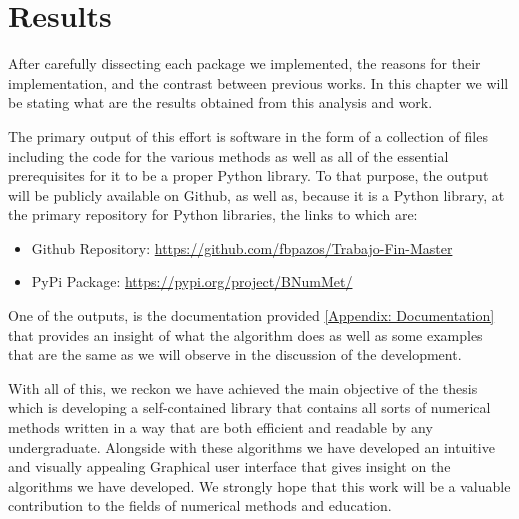 \chapter{Results}
After carefully dissecting each package we implemented, the reasons for their implementation, and the contrast between previous works. In this chapter we will be stating what are the results obtained from this analysis and work.

The primary output of this effort is software in the form of a collection of files including the code for the various methods as well as all of the essential prerequisites for it to be a proper Python library. To that purpose, the output will be publicly available on Github, as well as, because it is a Python library, at the primary repository for Python libraries, the links to which are:

\begin{itemize}
    \item Github Repository: \href{https://github.com/fbpazos/Trabajo-Fin-Master}{https://github.com/fbpazos/Trabajo-Fin-Master}
    \item PyPi Package: \href{https://pypi.org/project/BNumMet/}{https://pypi.org/project/BNumMet/}
\end{itemize}


One of the outputs, is the documentation provided \hyperlink{Appendix:Documentation}{[Appendix: Documentation]} that provides an insight of what the algorithm does as well as some examples that are the same as we will observe in the discussion of the development.

With all of this, we reckon we have achieved the main objective of the thesis which is developing a self-contained library that contains all sorts of numerical methods written in a way that are both efficient and readable by any undergraduate. Alongside with these algorithms we have developed an intuitive and visually appealing Graphical user interface that gives insight on the algorithms we have developed. We strongly hope that this work will be a valuable contribution to the fields of numerical methods and education.